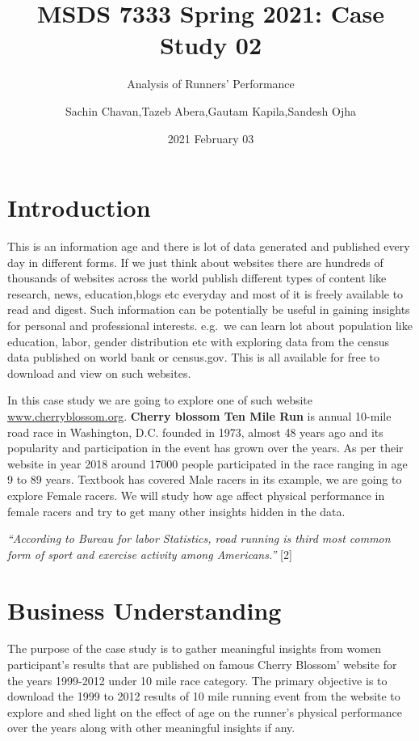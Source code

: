 \documentclass[
]{article}
\title{MSDS 7333 Spring 2021: Case Study 02}
\subtitle{Analysis of Runners' Performance}
\author{Sachin Chavan,Tazeb Abera,Gautam Kapila,Sandesh Ojha}
\date{2021 February 03}
\begin{document}
\maketitle

\hypertarget{introduction}{%
\section{Introduction}\label{introduction}}

This is an information age and there is lot of data generated and
published every day in different forms. If we just think about websites
there are hundreds of thousands of websites across the world publish
different types of content like research, news, education,blogs etc
everyday and most of it is freely available to read and digest. Such
information can be potentially be useful in gaining insights for
personal and professional interests. e.g.~we can learn lot about
population like education, labor, gender distribution etc with exploring
data from the census data published on world bank or census.gov. This is
all available for free to download and view on such websites.

In this case study we are going to explore one of such website
\href{http://www.cherryblossom.org/}{www.cherryblossom.org}.
\textbf{Cherry blossom Ten Mile Run} is annual 10-mile road race in
Washington, D.C. founded in 1973, almost 48 years ago and its popularity
and participation in the event has grown over the years. As per their
website in year 2018 around 17000 people participated in the race
ranging in age 9 to 89 years. Textbook has covered Male racers in its
example, we are going to explore Female racers. We will study how age
affect physical performance in female racers and try to get many other
insights hidden in the data.

\emph{``According to Bureau for labor Statistics, road running is third
most common form of sport and exercise activity among Americans.''}
{[}2{]}

\hypertarget{business-understanding}{%
\section{Business Understanding}\label{business-understanding}}

The purpose of the case study is to gather meaningful insights from
women participant's results that are published on famous Cherry Blossom'
website for the years 1999-2012 under 10 mile race category. The primary
objective is to download the 1999 to 2012 results of 10 mile running
event from the website to explore and shed light on the effect of age on
the runner's physical performance over the years along with other
meaningful insights if any.
\end{document}
